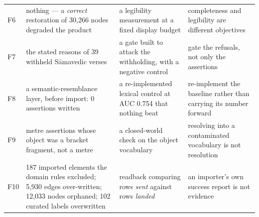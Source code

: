 \begin{table}[tb]
\begin{tabularx}{\linewidth}{@{}l>{\raggedright\arraybackslash}X
                             >{\raggedright\arraybackslash}p{27mm}
                             >{\raggedright\arraybackslash}X@{}}
F6 & nothing --- a \emph{correct} restoration of 30{,}266 nodes degraded the product
   & a legibility measurement at a fixed display budget
   & completeness and legibility are different objectives \\

F7 & the stated reasons of 39 withheld S\=amavedic verses
   & a gate built to attack the withholding, with a negative control
   & gate the refusals, not only the assertions \\

F8 & a semantic-resemblance layer, before import: 0 assertions written
   & a re-implemented lexical control at \mbox{AUC} 0.754 that nothing beat
   & re-implement the baseline rather than carrying its number forward \\

F9 & 33 metre assertions whose object was a bracket fragment, not a metre
   & a closed-world check on the object vocabulary
   & resolving into a contaminated vocabulary is not resolution \\

F10 & 13{,}187 imported elements the domain rules excluded; 5{,}930 edges
      over-written; 12{,}033 nodes orphaned; 102 curated labels overwritten
    & readback comparing rows \emph{sent} against rows \emph{landed}
    & an importer's own success report is not evidence \\

\bottomrule
\end{tabularx}
\end{table}
